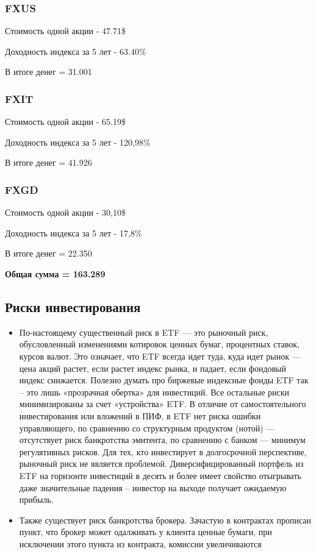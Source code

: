 \subsubsection{FXUS}

Стоимость одной акции - 47.71\$

Доходность индекса за 5 лет - 63.40\%

В итоге денег = 31.001

\subsubsection{FXIT}

Стоимость одной акции - 65.19\$

Доходность индекса за 5 лет - 120,98\%

В итоге денег = 41.926

\subsubsection{FXGD}

Стоимость одной акции - 30,10\$

Доходность индекса за 5 лет - 17,8\%

В итоге денег = 22.350


\textbf{Общая сумма = 163.289}

\subsection{Риски инвестирования}

\begin{itemize}
	\item По-настоящему существенный риск в ETF ­­— это рыночный риск, обусловленный изменениями котировок ценных бумаг, процентных ставок, курсов валют. Это означает, что ETF всегда идет туда, куда идет рынок — цена акций растет, если растет индекс рынка, и падает, если фондовый индекс снижается. Полезно думать про биржевые индексные фонды ETF так – это лишь «прозрачная обертка» для инвестиций. Все остальные риски минимизированы за счет «устройства» ETF. В отличие от самостоятельного инвестирования или вложений в ПИФ, в ETF нет риска ошибки управляющего, по сравнению со структурным продуктом (нотой) — отсутствует риск банкротства эмитента, по сравнению с банком — минимум регулятивных рисков. Для тех, кто инвестирует в долгосрочной перспективе, рыночный риск не является  проблемой. Диверсифицированный портфель из ETF на горизонте инвестиций в десять и более имеет свойство отыгрывать даже значительные падения – инвестор на выходе получает ожидаемую прибыль.
	\item Также существует риск банкротства брокера. Зачастую в контрактах прописан пункт, что брокер может одалживать у клиента ценные бумаги, при исключении этого пункта из контракта, комиссии увеличиваются
\end{itemize}